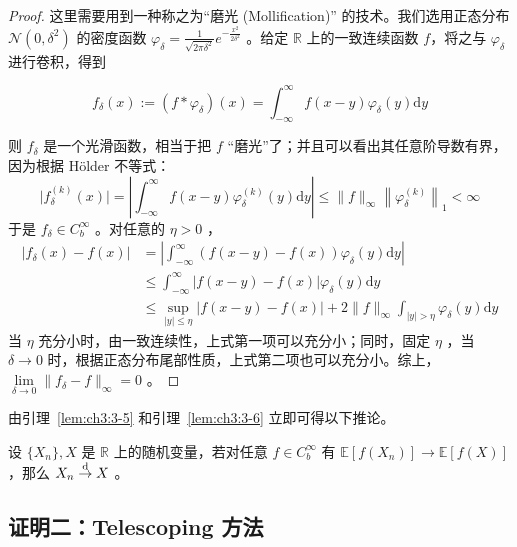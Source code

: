 \begin{proof}

这里需要用到一种称之为``磨光 (Mollification)'' 的技术。我们选用正态分布 $\mathcal{N}(0,\delta^2)$ 的密度函数 $\varphi_\delta=\frac1{\sqrt{2\pi\delta^2}}e^{-\frac{x^2}{2\delta^2}}$ 。给定 $\mathbb R$ 上的一致连续函数 $f$，将之与 $\varphi_\delta$ 进行卷积，得到

$$f_\delta(x):=(f*\varphi_\delta)(x)=\int_{-\infty}^\infty f(x-y)\varphi_\delta(y)\mathrm dy$$

则 $f_\delta$ 是一个光滑函数，相当于把 $f$ ``磨光''了；并且可以看出其任意阶导数有界，因为根据 Hölder 不等式： \[ \big|f^{(k)}_\delta(x)\big|=\left|\int_{-\infty}^\infty f(x-y)\varphi^{(k)}_\delta(y)\mathrm dy\right|\le \|f\|_\infty\left\|\varphi_\delta^{(k)}\right\|_1<\infty \]于是 $f_\delta\in C_b^\infty$ 。对任意的 $\eta>0$ ，
\[\begin{aligned} |f_\delta(x) - f(x)| &= \left| \int_{-\infty}^{\infty} (f(x-y) - f(x)) \varphi_\delta(y) \mathrm dy \right|\\ &\le \int_{-\infty}^{\infty} |f(x-y) - f(x)| \varphi_\delta(y) \mathrm dy\\ &\le \sup_{|y|\le \eta} |f(x-y) - f(x)|+2\|f\|_\infty\int_{|y|>\eta}\varphi_\delta (y)\mathrm{d}y \end{aligned}\]
当 $\eta$ 充分小时，由一致连续性，上式第一项可以充分小；同时，固定 $\eta$ ，当 $\delta\to 0$ 时，根据正态分布尾部性质，上式第二项也可以充分小。综上， $\lim\limits_{\delta\to 0}\|f_\delta -f\|_\infty=0$ 。

\end{proof}

由引理~\ref{lem:ch3:3-5} 和引理~\ref{lem:ch3:3-6} 立即可得以下推论。

\begin{corollary}

\label{cor:ch3:3-7}设 $\{X_n\},X$ 是 $\mathbb R$ 上的随机变量，若对任意 $f\in C_b^\infty$ 有 $\mathbb{E}[f(X_n)]\to \mathbb{E}[f(X)]$ ，那么 $X_n\overset{\rm d}\to X$ 。

\end{corollary}

\subsection{证明二：Telescoping 方法}

